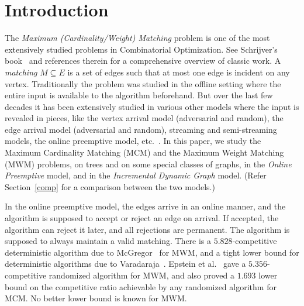 \documentclass[11pt]{article}
\begin{document}
\section{Introduction}
The {\em Maximum (Cardinality/Weight) Matching}  problem is one of the most extensively studied problems in Combinatorial Optimization. See Schrijver's book~\cite{schrijver} and references therein for a comprehensive overview of classic work. A {\em matching} $M\subseteq E$ is a set of edges such that at most one edge is incident on any vertex. Traditionally the problem was studied in the offline setting where the entire input is available to the algorithm beforehand. But over the last few decades it has been extensively studied in various other models where the input is revealed in pieces, like the vertex arrival model (adversarial and random), the edge arrival model (adversarial and random), streaming and semi-streaming models, the online preemptive model, etc.~\cite{karp,epstein,epstein2,mcgregor,feigenbaum,pruhs}. In this paper, we study the Maximum Cardinality Matching (MCM) and the Maximum Weight Matching (MWM) problems, on trees and on some special classes of graphs, in the {\em Online Preemptive} model, and in the {\em Incremental Dynamic Graph} model. (Refer Section~\ref{comp} for a comparison between the two models.)

In the online preemptive model, the edges arrive in an online manner, and the algorithm is supposed to accept or reject an edge on arrival. If accepted, the algorithm can reject it later, and all rejections are permanent. The algorithm is supposed to always maintain a valid matching. There is a $5.828$-competitive deterministic algorithm due to McGregor~\cite{mcgregor} for MWM, and a tight lower bound for deterministic algorithms due to Varadaraja~\cite{varadaraja}. Epstein et al.~\cite{epstein} gave a $5.356$-competitive randomized algorithm for MWM, and also proved a $1.693$ lower bound on the competitive ratio achievable by any randomized algorithm for MCM. No better lower bound is known for MWM.

\end{document}
